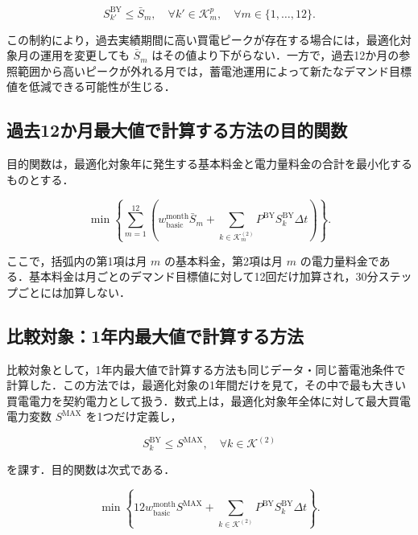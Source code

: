 \documentclass[a4paper,11pt,dvipdfmx]{jsarticle}
\begin{document}
\begin{equation}
    S^{\mathrm{BY}}_{k'} \leq \bar{S}_{m},
    \quad \forall k' \in \mathcal{K}^{p}_{m},
    \quad \forall m \in \{1,\dots,12\}.
\end{equation}

この制約により，過去実績期間に高い買電ピークが存在する場合には，最適化対象月の運用を変更しても $\bar{S}_{m}$ はその値より下がらない．一方で，過去12か月の参照範囲から高いピークが外れる月では，蓄電池運用によって新たなデマンド目標値を低減できる可能性が生じる．

\subsection{過去12か月最大値で計算する方法の目的関数}
目的関数は，最適化対象年に発生する基本料金と電力量料金の合計を最小化するものとする．

\begin{equation}
    \min
    \left\{
    \sum_{m=1}^{12}
    \left(
    w_{\mathrm{basic}}^{\mathrm{month}} \bar{S}_{m}
    +
    \sum_{k \in \mathcal{K}^{(2)}_{m}}
    P^{\mathrm{BY}} S^{\mathrm{BY}}_{k} \Delta t
    \right)
    \right\}.
\end{equation}

ここで，括弧内の第1項は月 $m$ の基本料金，第2項は月 $m$ の電力量料金である．基本料金は月ごとのデマンド目標値に対して12回だけ加算され，30分ステップごとには加算しない．

\subsection{比較対象：1年内最大値で計算する方法}
比較対象として，1年内最大値で計算する方法も同じデータ・同じ蓄電池条件で計算した．この方法では，最適化対象の1年間だけを見て，その中で最も大きい買電電力を契約電力として扱う．数式上は，最適化対象年全体に対して最大買電電力変数 $S^{\mathrm{MAX}}$ を1つだけ定義し，

\begin{equation}
    S^{\mathrm{BY}}_{k} \leq S^{\mathrm{MAX}},
    \quad \forall k \in \mathcal{K}^{(2)}
\end{equation}

を課す．目的関数は次式である．

\begin{equation}
    \min
    \left\{
    12 w_{\mathrm{basic}}^{\mathrm{month}} S^{\mathrm{MAX}}
    +
    \sum_{k \in \mathcal{K}^{(2)}}
    P^{\mathrm{BY}} S^{\mathrm{BY}}_{k} \Delta t
    \right\}.
\end{equation}
\end{document}
